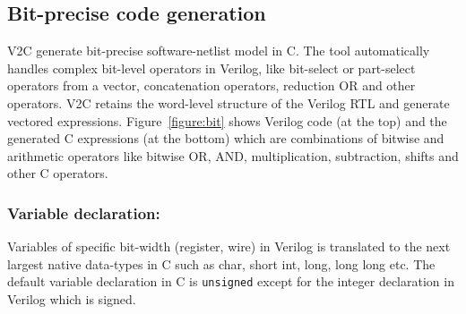 \subsection{Bit-precise code generation}


V2C generate bit-precise software-netlist model in C.
The tool automatically handles complex bit-level operators in Verilog, 
like bit-select or part-select operators from a vector,
concatenation operators, reduction OR and other operators. V2C retains 
the word-level structure of the Verilog RTL and generate 
vectored expressions. Figure~\ref{figure:bit} shows 
Verilog code (at the top) and the generated C expressions 
(at the bottom) which are combinations of bitwise and 
arithmetic operators like bitwise OR, AND, multiplication, 
subtraction, shifts and other C operators.     

\subsubsection{Variable declaration:} Variables of specific 
bit-width (register, wire) in Verilog is translated 
to the next largest native data-types in C such as 
char, short int, long, long long etc. The default 
variable declaration in C is \texttt{unsigned} except for 
the integer declaration in Verilog which is signed.

